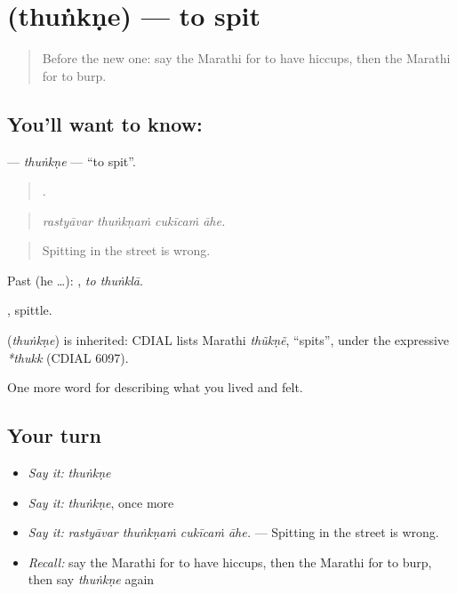 \section[\texorpdfstring{\mr{थुंकणे} (thuṅkṇe)}{थुंकणे (thuṅkṇe)}]{ (thuṅkṇe) — to spit}

\label{lesson:MR-C492-thunkne}



\begin{quote}
Before the new one: say the Marathi for to have hiccups, then the Marathi for to burp.
\end{quote}

\subsection*{You'll want to know: }
\textbf{} — \emph{thuṅkṇe} — \textquotedblleft{}to spit\textquotedblright{}.

\begin{quote}
   .
\end{quote}

\begin{quote}
\emph{rastyāvar thuṅkṇaṁ cukīcaṁ āhe.}
\end{quote}

\begin{quote}
Spitting in the street is wrong.
\end{quote}

Past (he …):  , \emph{to thuṅklā}.

, spittle.

\begin{cousinweb}
\textbf{} (\emph{thuṅkṇe}) is inherited: CDIAL lists Marathi \emph{thũkṇẽ}, \textquotedblleft{}spits\textquotedblright{}, under the expressive \emph{*thukk} (CDIAL 6097).
\end{cousinweb}

\begin{grammarlens}[title={What you've built}]
One more word for describing what you lived and felt.
\end{grammarlens}

\subsection*{Your turn}
\begin{itemize}
\raggedright
  \item \emph{Say it:} \emph{thuṅkṇe}
  \item \emph{Say it:} \emph{thuṅkṇe}, once more
  \item \emph{Say it:} \emph{rastyāvar thuṅkṇaṁ cukīcaṁ āhe.} — Spitting in the street is wrong.
  \item \emph{Recall:} say the Marathi for to have hiccups, then the Marathi for to burp, then say \emph{thuṅkṇe} again
\end{itemize}

